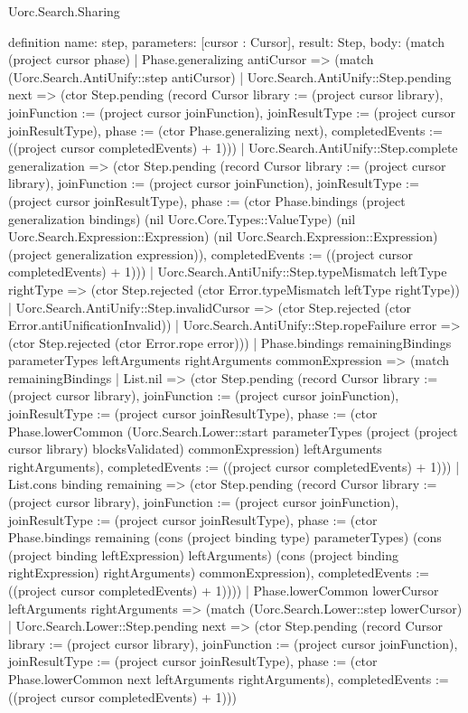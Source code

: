 \begin{lexlean}{Uorc.Search.Sharing}
\begin{semanticmodule}
definition{
  name: step,
  parameters: [cursor : Cursor],
  result: Step,
  body: (match (project cursor phase)
    | Phase.generalizing antiCursor => (match (Uorc.Search.AntiUnify::step antiCursor)
      | Uorc.Search.AntiUnify::Step.pending next => (ctor Step.pending (record Cursor {library := (project cursor library), joinFunction := (project cursor joinFunction), joinResultType := (project cursor joinResultType), phase := (ctor Phase.generalizing next), completedEvents := ((project cursor completedEvents) + 1)}))
      | Uorc.Search.AntiUnify::Step.complete generalization => (ctor Step.pending (record Cursor {library := (project cursor library), joinFunction := (project cursor joinFunction), joinResultType := (project cursor joinResultType), phase := (ctor Phase.bindings (project generalization bindings) (nil Uorc.Core.Types::ValueType) (nil Uorc.Search.Expression::Expression) (nil Uorc.Search.Expression::Expression) (project generalization expression)), completedEvents := ((project cursor completedEvents) + 1)}))
      | Uorc.Search.AntiUnify::Step.typeMismatch leftType rightType => (ctor Step.rejected (ctor Error.typeMismatch leftType rightType))
      | Uorc.Search.AntiUnify::Step.invalidCursor => (ctor Step.rejected (ctor Error.antiUnificationInvalid))
      | Uorc.Search.AntiUnify::Step.ropeFailure error => (ctor Step.rejected (ctor Error.rope error)))
    | Phase.bindings remainingBindings parameterTypes leftArguments rightArguments commonExpression => (match remainingBindings
      | List.nil => (ctor Step.pending (record Cursor {library := (project cursor library), joinFunction := (project cursor joinFunction), joinResultType := (project cursor joinResultType), phase := (ctor Phase.lowerCommon (Uorc.Search.Lower::start parameterTypes (project (project cursor library) blocksValidated) commonExpression) leftArguments rightArguments), completedEvents := ((project cursor completedEvents) + 1)}))
      | List.cons binding remaining => (ctor Step.pending (record Cursor {library := (project cursor library), joinFunction := (project cursor joinFunction), joinResultType := (project cursor joinResultType), phase := (ctor Phase.bindings remaining (cons (project binding type) parameterTypes) (cons (project binding leftExpression) leftArguments) (cons (project binding rightExpression) rightArguments) commonExpression), completedEvents := ((project cursor completedEvents) + 1)})))
    | Phase.lowerCommon lowerCursor leftArguments rightArguments => (match (Uorc.Search.Lower::step lowerCursor)
      | Uorc.Search.Lower::Step.pending next => (ctor Step.pending (record Cursor {library := (project cursor library), joinFunction := (project cursor joinFunction), joinResultType := (project cursor joinResultType), phase := (ctor Phase.lowerCommon next leftArguments rightArguments), completedEvents := ((project cursor completedEvents) + 1)}))
}
\end{semanticmodule}
\end{lexlean}
